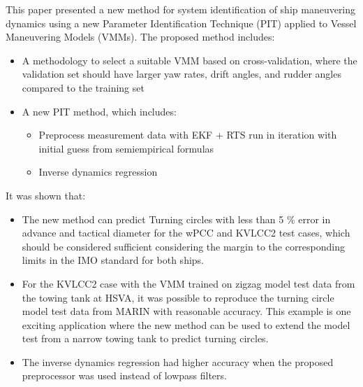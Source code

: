 \documentclass[review]{elsarticle}
\begin{document}
This paper presented a new method for system identification of ship maneuvering dynamics using a new Parameter Identification Technique (PIT) applied to Vessel Maneuvering Models (VMMs). The proposed method includes:
\begin{itemize}
\item {} 
  
A methodology to select a suitable VMM based on cross-validation, where the validation set should have larger yaw rates, drift angles, and rudder angles compared to the training set

\item {} 
  
A new PIT method, which includes:
\begin{itemize}
\item {} 
  
Preprocess measurement data with EKF + RTS run in iteration with initial guess from semi\sphinxhyphen{}empirical formulas

\item {} 
  
Inverse dynamics regression

\end{itemize}

\end{itemize}

  
It was shown that:
\begin{itemize}
\item {} 
  
The new method can predict Turning circles with less than 5 \% error in advance and tactical diameter for the wPCC and KVLCC2 test cases, which should be considered sufficient considering the margin to the corresponding limits in the IMO standard for both ships.

\item {} 
  
For the KVLCC2 case with the VMM trained on zigzag model test data from the towing tank at HSVA, it was possible to reproduce the turning circle model test data from MARIN with reasonable accuracy. This example is one exciting application where the new method can be used to extend the model test from a narrow towing tank to predict turning circles.

\item {} 
  
The inverse dynamics regression had higher accuracy when the proposed preprocessor was used instead of low\sphinxhyphen{}pass filters.

\end{itemize}
\end{document}
